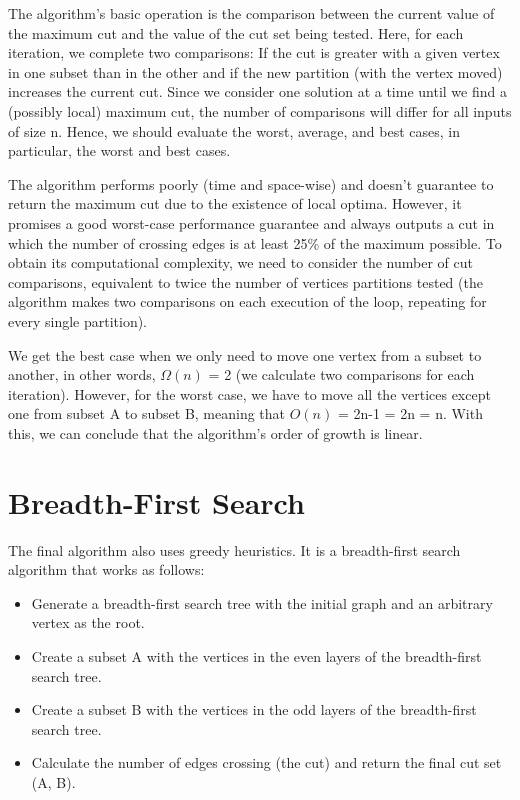 \documentclass[]{revdetua}
\begin{document}
The algorithm's basic operation is the comparison between the current value of the maximum cut and the value of the cut set being tested. Here, for each iteration, we complete two comparisons: If the cut is greater with a given vertex in one subset than in the other and if the new partition (with the vertex moved) increases the current cut. Since we consider one solution at a time until we find a (possibly local) maximum cut, the number of comparisons will differ for all inputs of size n. Hence, we should evaluate the worst, average, and best cases, in particular, the worst and best cases.

The algorithm performs poorly (time and space-wise) and doesn't guarantee to return the maximum cut due to the existence of local optima. However, it promises a good worst-case performance guarantee and always outputs a cut in which the number of crossing edges is at least 25\% of the maximum possible. To obtain its computational complexity, we need to consider the number of cut comparisons, equivalent to twice the number of vertices partitions tested (the algorithm makes two comparisons on each execution of the loop, repeating for every single partition).

We get the best case when we only need to move one vertex from a subset to another, in other words, $\Omega(n)$ = 2 (we calculate two comparisons for each iteration). However, for the worst case, we have to move all the vertices except one from subset A to subset B, meaning that $O(n)$ = 2n-1 = 2n = n. With this, we can conclude that the algorithm's order of growth is linear.

\section{Breadth-First Search}

The final algorithm also uses greedy heuristics. It is a breadth-first search algorithm that works as follows:
\begin{itemize}
\item Generate a breadth-first search tree with the initial graph and an arbitrary vertex as the root.
\item Create a subset A with the vertices in the even layers of the breadth-first search tree.
\item Create a subset B with the vertices in the odd layers of the breadth-first search tree.
\item Calculate the number of edges crossing (the cut) and return the final cut set (A, B).
\end{itemize}
\end{document}
